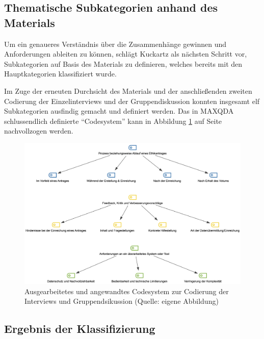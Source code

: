 \documentclass[a4paper,12pt,twoside]{scrreprt}
\begin{document}
\subsection{Thematische Subkategorien anhand des Materials}
\label{sub-sec:thematische-subkategorien}

Um ein genaueres Verständnis über die Zusammenhänge gewinnen und Anforderungen ableiten zu können, schlägt Kuckartz als nächsten Schritt vor, Subkategorien auf Basis des Materials zu definieren, welches bereits mit den Hauptkategorien klassifiziert wurde. \cite[106]{kuckartz_qualitative_2018}

Im Zuge der erneuten Durchsicht des Materials und der anschließenden zweiten Codierung der Einzelinterviews und der Gruppendiskussion konnten insgesamt elf Subkategorien ausfindig gemacht und definiert werden. Das in MAXQDA schlussendlich definierte \enquote{Codesystem} kann in Abbildung \ref{fig:angewandtes-codesystem} auf Seite \pageref{fig:angewandtes-codesystem} nachvollzogen werden.

\begin{figure}[ht]
    \centering
    \includegraphics[width=\linewidth]{thesis/images/Luidold_Codesystem.png}
    \caption[Ausgearbeitetes und angewandtes Codesystem zur Codierung der Interviews und Gruppendsikussion]{Ausgearbeitetes und angewandtes Codesystem zur Codierung der Interviews und Gruppendsikussion (Quelle: eigene Abbildung)}
    \label{fig:angewandtes-codesystem}
\end{figure}

\subsection{Ergebnis der Klassifizierung}
\label{sub-sec:ergebnis-klassifizierung}
\end{document}
